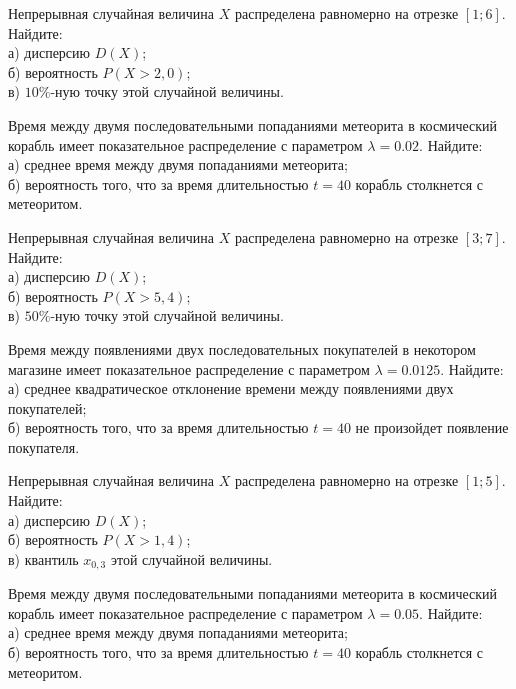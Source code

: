 \vfill

\newpage\setcounter{zad}{0}

\z Непрерывная случайная величина $X$ распределена равномерно на отрезке $[1; 6]$. Найдите: \\ \quad а) дисперсию $D(X)$; \\ \quad б) вероятность $P(X>2{,}0)$; \\ \quad в) $10\%$-ную точку этой случайной величины.


\vfill

\z Время между двумя последовательными попаданиями метеорита в космический корабль имеет показательное распределение с параметром $\lambda = 0.02$. Найдите: \\ \quad а) среднее время между двумя попаданиями метеорита; \\ \quad б) вероятность того, что за время длительностью $t = 40$ корабль  столкнется с метеоритом.
 

\vfill

\newpage\setcounter{zad}{0}

\z Непрерывная случайная величина $X$ распределена равномерно на отрезке $[3; 7]$. Найдите: \\ \quad а) дисперсию $D(X)$; \\ \quad б) вероятность $P(X>5{,}4)$; \\ \quad в) $50\%$-ную точку этой случайной величины.


\vfill

\z Время между появлениями двух последовательных покупателей в некотором магазине имеет показательное распределение с параметром $\lambda = 0.0125$. Найдите: \\ \quad а) среднее квадратическое отклонение времени между появлениями двух покупателей; \\ \quad б) вероятность того, что за время длительностью $t = 40$ не произойдет появление покупателя.
 

\vfill

\newpage\setcounter{zad}{0}

\z Непрерывная случайная величина $X$ распределена равномерно на отрезке $[1; 5]$. Найдите: \\ \quad а) дисперсию $D(X)$; \\ \quad б) вероятность $P(X>1{,}4)$; \\ \quad в) квантиль $x_{0{,}3}$ этой случайной величины.


\vfill

\z Время между двумя последовательными попаданиями метеорита в космический корабль имеет показательное распределение с параметром $\lambda = 0.05$. Найдите: \\ \quad а) среднее время между двумя попаданиями метеорита; \\ \quad б) вероятность того, что за время длительностью $t = 40$ корабль  столкнется с метеоритом.
 

